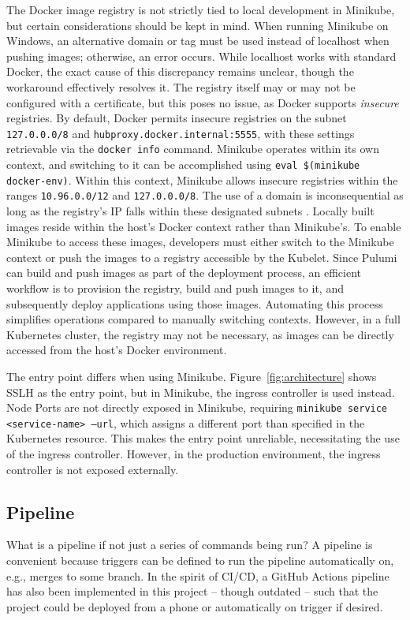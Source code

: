 The Docker image registry is not strictly tied to local development in Minikube, but certain considerations should be kept in mind. When running Minikube on Windows, an alternative domain or tag must be used instead of localhost when pushing images; otherwise, an error occurs. While localhost works with standard Docker, the exact cause of this discrepancy remains unclear, though the workaround effectively resolves it. The registry itself may or may not be configured with a certificate, but this poses no issue, as Docker supports \textit{insecure} registries. By default, Docker permits insecure registries on the subnet \texttt{127.0.0.0/8} and \texttt{hubproxy.docker.internal:5555}, with these settings retrievable via the \texttt{docker info} command. Minikube operates within its own context, and switching to it can be accomplished using \texttt{eval \$(minikube docker-env)}. Within this context, Minikube allows insecure registries within the ranges \texttt{10.96.0.0/12} and \texttt{127.0.0.0/8}. The use of a domain is inconsequential as long as the registry's IP falls within these designated subnets \Parencite{dockerInsecureRegistries}. Locally built images reside within the host's Docker context rather than Minikube's. To enable Minikube to access these images, developers must either switch to the Minikube context or push the images to a registry accessible by the Kubelet. Since Pulumi can build and push images as part of the deployment process, an efficient workflow is to provision the registry, build and push images to it, and subsequently deploy applications using those images. Automating this process simplifies operations compared to manually switching contexts. However, in a full Kubernetes cluster, the registry may not be necessary, as images can be directly accessed from the host's Docker environment.

The entry point differs when using Minikube. Figure~\ref{fig:architecture} shows SSLH as the entry point, but in Minikube, the ingress controller is used instead. Node Ports are not directly exposed in Minikube, requiring \texttt{minikube service <service-name> --url}, which assigns a different port than specified in the Kubernetes resource. This makes the entry point unreliable, necessitating the use of the ingress controller. However, in the production environment, the ingress controller is not exposed externally.

\subsection{Pipeline}
What is a pipeline if not just a series of commands being run? A pipeline is convenient because triggers can be defined to run the pipeline automatically on, e.g., merges to some branch. In the spirit of CI/CD, a GitHub Actions pipeline has also been implemented in this project -- though outdated -- such that the project could be deployed from a phone or automatically on trigger if desired.

